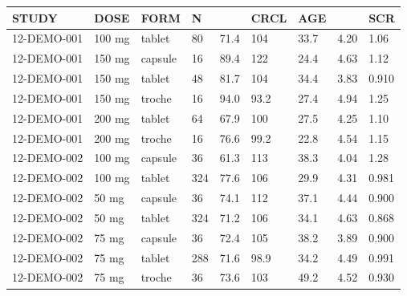 \setlength{\tabcolsep}{5pt}
\begin{threeparttable}
\renewcommand\arraystretch{1.3}
\begin{tabular}[h]{lllllllll}
\hline
STUDY & DOSE & FORM & N &  & CRCL & AGE &  & SCR \\
\hline
12-DEMO-001 & 100 mg & tablet & 80 & 71.4 & 104 & 33.7 & 4.20 & 1.06 \\
12-DEMO-001 & 150 mg & capsule & 16 & 89.4 & 122 & 24.4 & 4.63 & 1.12 \\
12-DEMO-001 & 150 mg & tablet & 48 & 81.7 & 104 & 34.4 & 3.83 & 0.910 \\
12-DEMO-001 & 150 mg & troche & 16 & 94.0 & 93.2 & 27.4 & 4.94 & 1.25 \\
12-DEMO-001 & 200 mg & tablet & 64 & 67.9 & 100 & 27.5 & 4.25 & 1.10 \\
12-DEMO-001 & 200 mg & troche & 16 & 76.6 & 99.2 & 22.8 & 4.54 & 1.15 \\
12-DEMO-002 & 100 mg & capsule & 36 & 61.3 & 113 & 38.3 & 4.04 & 1.28 \\
12-DEMO-002 & 100 mg & tablet & 324 & 77.6 & 106 & 29.9 & 4.31 & 0.981 \\
12-DEMO-002 & 50 mg & capsule & 36 & 74.1 & 112 & 37.1 & 4.44 & 0.900 \\
12-DEMO-002 & 50 mg & tablet & 324 & 71.2 & 106 & 34.1 & 4.63 & 0.868 \\
12-DEMO-002 & 75 mg & capsule & 36 & 72.4 & 105 & 38.2 & 3.89 & 0.900 \\
12-DEMO-002 & 75 mg & tablet & 288 & 71.6 & 98.9 & 34.2 & 4.49 & 0.991 \\
12-DEMO-002 & 75 mg & troche & 36 & 73.6 & 103 & 49.2 & 4.52 & 0.930 \\
\hline
\end{tabular}
\end{threeparttable}
